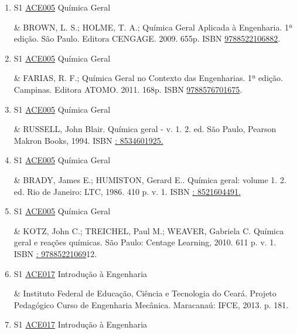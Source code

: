 \documentclass[12pt,a4paper]{book}
\begin{document}
\begin{enumerate}
 \item S1 \hyperref[PUD:ACE005]{ACE005} Química Geral

&  BROWN, L.  S.;  HOLME, T.  A.;  Química Geral Aplicada à Engenharia.  1ª edição.  São Paulo.  Editora CENGAGE.  2009.  655p.  ISBN \href{http://www.bn.br/site/pages/servicosProfissionais/agenciaISBN/isbnBusca/FbnBuscaISBNCatalogo.asp?pField=ISBN&pIntPagina=1&pISBN=22106882&nidbISBN=true&hidbISBN=true}{9788522106882}. 
 

 \item S1 \hyperref[PUD:ACE005]{ACE005} Química Geral

&  FARIAS, R.  F.;  Química Geral no Contexto das Engenharias.  1ª edição.  Campinas.  Editora ATOMO.  2011.  168p.  ISBN \href{http://www.bn.br/site/pages/servicosProfissionais/agenciaISBN/isbnBusca/FbnBuscaISBNCatalogo.asp?pField=ISBN&pIntPagina=1&pISBN=76701675&nidbISBN=true&hidbISBN=true}{9788576701675}.
 \item S1 \hyperref[PUD:ACE005]{ACE005} Química Geral

&  RUSSELL, John Blair.  Química geral - v. 1.  2.  ed.  São Paulo, Pearson Makron Books, 1994.  ISBN \href{http://www.google.com/search?hl=pt-BR&tbo=p&tbm=bks&q=isbn:: 8534601925.&num=10}{: 8534601925.} 
 

 \item S1 \hyperref[PUD:ACE005]{ACE005} Química Geral

&  BRADY, James E.;  HUMISTON, Gerard E..  Química geral: volume 1.  2.  ed.  Rio de Janeiro: LTC, 1986.  410 p.  v.  1.  ISBN \href{http://www.google.com/search?hl=pt-BR&tbo=p&tbm=bks&q=isbn:: 8521604491.&num=10}{: 8521604491.} 
 

 \item S1 \hyperref[PUD:ACE005]{ACE005} Química Geral

&  KOTZ, John C.;  TREICHEL, Paul M.;  WEAVER, Gabriela C.  Química geral e reações químicas.  São Paulo: Centage Learning, 2010.  611 p.  v.  1.  ISBN \href{http://www.google.com/search?hl=pt-BR&tbo=p&tbm=bks&q=isbn:: 97885221069&num=10}{: 97885221069}12.
 \item S1 \hyperref[PUD:ACE017]{ACE017} Introdução à Engenharia

& Instituto Federal de Educação, Ciência e Tecnologia do Ceará.  Projeto Pedagógico Curso de Engenharia Mecânica.  Maracanaú: IFCE, 2013.  p.  181. 
 

 \item S1 \hyperref[PUD:ACE017]{ACE017} Introdução à Engenharia


\end{enumerate}
\end{document}

